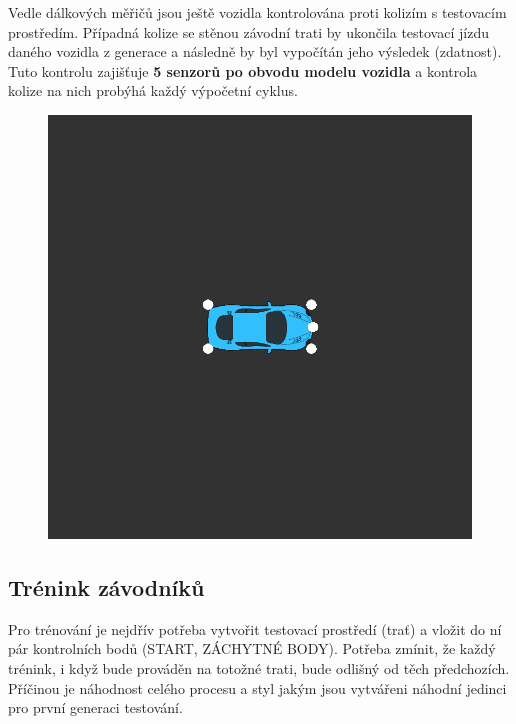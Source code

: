 \documentclass[a4paper,12pt]{article}
\newcommand{\tab}
{
    \hspace*{1em}
}
\begin{document}
            \tab Vedle dálkových měřičů jsou ještě vozidla kontrolována proti kolizím s testovacím 
            prostředím. Případná kolize se stěnou závodní trati by ukončila testovací jízdu
            daného vozidla z generace a následně by byl vypočítán jeho výsledek (zdatnost).
            Tuto kontrolu zajišťuje \textbf{5 senzorů po obvodu modelu vozidla} a kontrola
            kolize na nich probýhá každý výpočetní cyklus.
            
            \begin{figure}[H]
                \centering
                \includegraphics[width=1\textwidth]{data/collisionpoints.png}
                \label{fig:collisionpoints}
            \end{figure}

        \subsection{Trénink závodníků}
            Pro trénování je nejdřív potřeba vytvořit testovací prostředí (trať) a vložit
            do ní pár kontrolních bodů (START, ZÁCHYTNÉ BODY). Potřeba zmínit,
            že každý trénink, i když bude prováděn na totožné trati, bude odlišný od těch
            předchozích. Příčinou je náhodnost celého procesu a styl jakým jsou vytvářeni
            náhodní jedinci pro první generaci testování.
\end{document}
